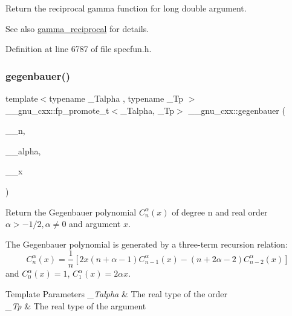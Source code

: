 Return the reciprocal gamma function for {\ttfamily  long double } argument.

\begin{DoxySeeAlso}{See also}
\hyperlink{group__gnu__math__spec__func_ga641f9bcdb8fc32a9a0ce7a15b5040076}{gamma\+\_\+reciprocal} for details. 
\end{DoxySeeAlso}


Definition at line 6787 of file specfun.\+h.

\mbox{\label{group__gnu__math__spec__func_ga173ae710f76407f5997a4caa5c3c060e}} 
\subsubsection{\texorpdfstring{gegenbauer()}{gegenbauer()}}
{\footnotesize\ttfamily template$<$typename \+\_\+\+Talpha , typename \+\_\+\+Tp $>$ \\
\+\_\+\+\_\+gnu\+\_\+cxx\+::fp\+\_\+promote\+\_\+t$<$\+\_\+\+Talpha, \+\_\+\+Tp$>$ \+\_\+\+\_\+gnu\+\_\+cxx\+::gegenbauer (\begin{DoxyParamCaption}\item[{unsigned int}]{\+\_\+\+\_\+n,  }\item[{\+\_\+\+Talpha}]{\+\_\+\+\_\+alpha,  }\item[{\+\_\+\+Tp}]{\+\_\+\+\_\+x }\end{DoxyParamCaption})\hspace{0.3cm}{\ttfamily [inline]}}

Return the Gegenbauer polynomial $ C_n^{\alpha}(x) $ of degree {\ttfamily n} and real order $ \alpha > -1/2, \alpha \neq 0 $ and argument $ x $.

The Gegenbauer polynomial is generated by a three-\/term recursion relation\+: \[ C_n^{\alpha}(x) = \frac{1}{n}\left[ 2x(n+\alpha-1)C_{n-1}^{\alpha}(x) - (n+2\alpha-2)C_{n-2}^{\alpha}(x) \right] \] and $ C_0^{\alpha}(x) = 1 $, $ C_1^{\alpha}(x) = 2\alpha x $.


\begin{DoxyTemplParams}{Template Parameters}
{\em \+\_\+\+Talpha} & The real type of the order \\
\hline
{\em \+\_\+\+Tp} & The real type of the argument \\
\hline
\end{DoxyTemplParams}

